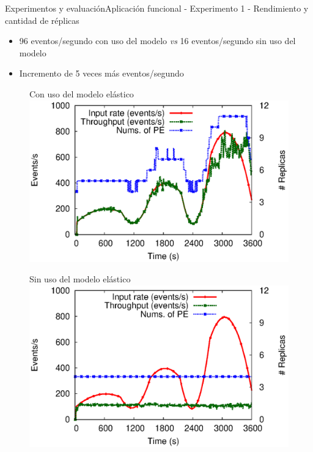 \begin{frame}{Experimentos y evaluación}{Aplicación funcional - Experimento 1 - Rendimiento y cantidad de réplicas}

\begin{itemize}
\item 96 eventos/segundo con uso del modelo \textit{vs} 16 eventos/segundo sin uso del modelo
\item Incremento de 5 veces más eventos/segundo
\end{itemize}

\begin{multicols}{2}
\begin{figure}[p]
	\centering
	{\scriptsize Con uso del modelo elástico\\}
	\includegraphics[scale=0.4]{images/exp/app1/dynamic/adaptative/exp1-processSystem.eps}
\end{figure}

\begin{figure}[p]
	\centering
	{\scriptsize Sin uso del modelo elástico\\}
	\includegraphics[scale=0.4]{images/exp/app1/dynamic/baseline/exp1-processSystem.eps}
\end{figure}
\end{multicols}
\end{frame}

